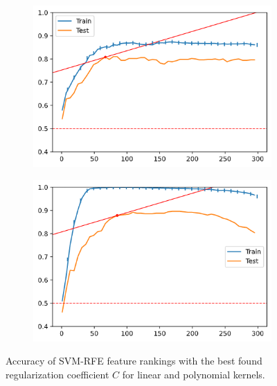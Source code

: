 \begin{figure}[H]
    \centering
    \begin{subfigure}[b]{0.4\linewidth}
        \includegraphics[width=\linewidth]{img/ch5/kernel/art_linear.png}
    \end{subfigure}
    \begin{subfigure}[b]{0.4\linewidth}
        \includegraphics[width=\linewidth]{img/ch5/kernel/art_poly.png}
    \end{subfigure}
    \caption[Non-linear kernel: SVM-RFE comparison linear vs non-linear]{Accuracy of SVM-RFE feature rankings with the best found regularization coefficient $C$ for linear and polynomial kernels.}
    \label{fig:ch5.kernel.cmp2}
\end{figure}

